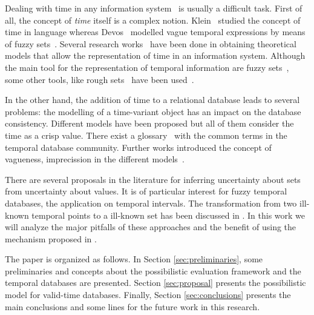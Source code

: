 Dealing with time in any information system~\cite{Bolour82} is usually a difficult task. First of all, the concept of \emph{time} itself is a complex notion. Klein~\cite{klein94} studied the concept of time in language whereas Devos~\cite{devos94} modelled vague temporal expressions by means of fuzzy sets~\cite{zadeh65}.  Several research works~\cite{cruyssen97,devos98,Cru97} have been done in obtaining theoretical models that allow the representation of time in an information system. Although the main tool for the representation of temporal information are fuzzy sets~\cite{Virant199639,35337,343607,springerlink:10.1007/978-3-540-39964-3_57,Dubois:jucs_9_9:fuzziness_and_uncertainty_in}, some other tools, like rough sets~\cite{pawlak95} have been used~\cite{Qia09}.

In the other hand, the addition of time to a relational database leads to several problems: the modelling of a time-variant object has an impact on the database consistency. Different models have been proposed \cite{Jensen94,TSQL,Sarda90,Jensen91,Snodgrass84,Nascimento95} but all of them consider the time as a crisp value. 
There exist a glossary~\cite{Dyreson1994} with the common terms in the temporal database community.
Further works introduced the concept of vagueness, imprecission in the different models~\cite{Cru97,624013,fuzz2009,gal01}. 







There are several proposals in the literature for inferring uncertainty about sets from uncertainty about values. It is of particular interest for fuzzy temporal databases, the application on temporal intervals. The transformation from two ill-known temporal points to a ill-known set has been discussed in \cite{Garrido2009}. In this work we will analyze the major pitfalls of these approaches and the benefit of using the mechanism proposed in \cite{Pon11}.

The paper is organized as follows. In Section \ref{sec:preliminaries}, some preliminaries and concepts about the possibilistic evaluation framework and the temporal databases are presented. 
Section \ref{sec:proposal} presents the possibilistic model for valid-time databases.
Finally, Section \ref{sec:conclusions} presents the main conclusions and some lines for the future work in this research.
